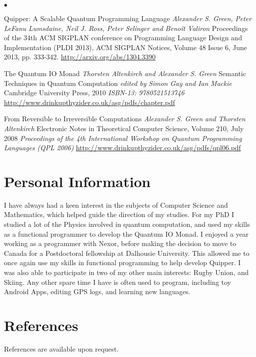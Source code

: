 \documentclass[line]{res}
\newenvironment{list2}{
  \begin{list}{$\bullet$}{%
      \setlength{\itemsep}{0in}
      \setlength{\parsep}{0.045in} \setlength{\parskip}{0in}
      \setlength{\topsep}{0in} \setlength{\partopsep}{0in}
      \setlength{\leftmargin}{0.2in}}}{\end{list}}
\begin{document}
\begin{resume}
\begin{list2}
\item Quipper: A Scalable Quantum Programming Language
\emph{Alexander S. Green, Peter LeFanu Lumsdaine, Neil J. Ross, 
 Peter Selinger and Beno\^{i}t Valiron}
Proceedings of the 34th ACM SIGPLAN conference on Programming
Language Design and Implementation (PLDI 2013), ACM SIGPLAN Notices,
Volume 48 Issue 6, June 2013, pp. 333-342.
\url{http://arxiv.org/abs/1304.3390}

\item The Quantum IO Monad
\emph{Thorsten Altenkirch and Alexander S. Green}
Semantic Techniques in Quantum Computation 
\emph{edited by Simon Gay and Ian Mackie}
Cambridge University Press, 2010
\emph{ISBN-13: 9780521513746}
\url{http://www.drinkupthyzider.co.uk/asg/pdfs/chapter.pdf}

\item From Reversible to Irreversible Computations 
\emph{Alexander S. Green and Thorsten Altenkirch}
Electronic Notes in Theoretical Computer Science, Volume 210, July
2008
\emph{Proceedings of the 4th International Workshop on Quantum
  Programming Languages (QPL 2006)}
\url{http://www.drinkupthyzider.co.uk/asg/pdfs/qpl06.pdf}
\end{list2}

\vspace{-4mm}
\section{\sc Personal Information}
I have always had a keen interest in the subjects of Computer Science
and Mathematics, which helped guide the direction of my studies. For
my PhD I studied a lot of the Physics involved in quantum 
computation, and used my skills as a functional programmer to develop
the Quantum IO Monad. I enjoyed a year working as a
programmer with Nexor, before making the decision to move to Canada
for a Postdoctoral fellowship at Dalhousie University. This
allowed me to once again use my skills in functional programming to
help develop Quipper. I was also able to participate in two of my
other main interests: Rugby Union, and Skiing. Any other spare time I
have is often used to program, including toy Android Apps, 
editing GPS logs, and learning new languages.

\vspace{-4mm}
\section{\sc References}
References are available upon request.

\end{resume}
\end{document}
